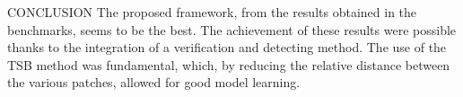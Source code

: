 \begin{frame}{CONCLUSION}
    The proposed framework, from the results obtained in the benchmarks, seems 
    to be the best. The achievement of these results were possible thanks to the 
    integration of a verification and detecting method. The use of the TSB 
    method was fundamental, which, by reducing the relative distance between 
    the various patches, allowed for good model learning.
\end{frame}